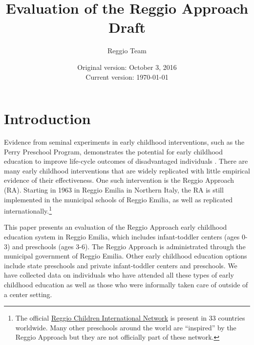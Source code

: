 




\title{Evaluation of the Reggio Approach \\ Draft}
\author{Reggio Team}
\date{Original version: October 3, 2016 \\ Current version: \today}
\maketitle

\tableofcontents

\doublespacing

\section{Introduction}
\label{sec:introduction}
Evidence from seminal experiments in early childhood interventions, such as the Perry Preschool Program, demonstrates the potential for early childhood education to improve life-cycle outcomes of disadvantaged individuals \citep{Heckman_Moon_etal_2010_QE, Elango_Hojman_etal_2016_Early-Edu}. There are many early childhood interventions that are widely replicated with little empirical evidence of their effectiveness. One such intervention is the Reggio Approach (RA). Starting in 1963 in Reggio Emilia in Northern Italy, the RA is still implemented in the municipal schools of Reggio Emilia, as well as replicated internationally.\footnote{The official \href{http://www.reggiochildren.it/network/?lang=en}{Reggio Children International Network} is present in 33 countries worldwide. Many other preschools around the world are ``inspired'' by the Reggio Approach but they are not officially part of these network.}

This paper presents an evaluation of the Reggio Approach early childhood education system in Reggio Emilia, which includes infant-toddler centers (ages 0-3) and preschools (ages 3-6). The Reggio Approach is administrated through the municipal government of Reggio Emilia. Other early childhood education options include state preschools and private infant-toddler centers and preschools. We have collected data on individuals who have attended all these types of early childhood education as well as those who were informally taken care of outside of a center setting. 

